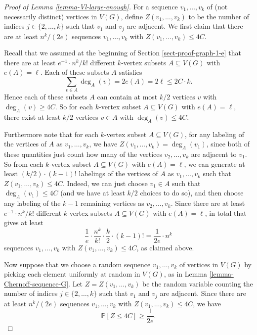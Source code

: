 \begin{proof}[Proof of Lemma \ref{lemma-Vl-large-enough}]
For a sequence $v_1,\dots, v_k$ of (not necessarily distinct) vertices in $V(G)$, define $Z(v_1,\dots,v_k)$ to be the number of indices $j\in \lbrace 2,\dots,k\rbrace$ such that $v_1$ and $v_j$ are adjacent. We first claim that there are at least $n^k/(2e)$ sequences $v_1,\dots, v_k$ with $Z(v_1,\dots,v_k)\leq 4C$.

Recall that we assumed at the beginning of Section \ref{sect-proof-graph-1-e} that there are at least $e^{-1}\cdot n^k/k!$ different $k$-vertex subsets $A\subseteq V(G)$ with $e(A)=\ell$. Each of these subsets $A$ satisfies
\[\sum_{v\in A}\deg_A(v)=2e(A)=2\ell\leq 2C\cdot k.\]
Hence each of these subsets $A$ can contain at most $k/2$ vertices $v$ with $\deg_A(v)\geq 4C$. So for each $k$-vertex subset $A\subseteq V(G)$ with $e(A)=\ell$, there exist at least $k/2$ vertices $v\in A$ with $\deg_A(v)\leq 4C$.

Furthermore note that for each $k$-vertex subset $A\subseteq V(G)$, for any labeling of the vertices of $A$ as $v_1,\dots,v_k$, we have $Z(v_1,\dots,v_k)=\deg_A(v_1)$, since both of these quantities just count how many of the vertices $v_2,\dots,v_k$ are adjacent to $v_1$. So from each $k$-vertex subset $A\subseteq V(G)$ with $e(A)=\ell$, we can generate at least $(k/2)\cdot (k-1)!$ labelings of the vertices of $A$ as $v_1,\dots,v_k$ such that $Z(v_1,\dots,v_k)\leq 4C$. Indeed, we can just choose $v_1\in A$ such that $\deg_A(v_1)\leq 4C$ (and we have at least $k/2$ choices to do so), and then choose any labeling of the $k-1$ remaining vertices as $v_2,\dots,v_k$. Since there are at least $e^{-1}\cdot n^k/k!$ different $k$-vertex subsets $A\subseteq V(G)$ with $e(A)=\ell$, in total that gives at least
\[\frac{1}{e}\cdot \frac{n^k}{k!}\cdot \frac{k}{2}\cdot (k-1)!=\frac{1}{2e}\cdot n^k\]
sequences $v_1,\dots, v_k$ with $Z(v_1,\dots,v_k)\leq 4C$, as claimed above.

Now suppose that we choose a random sequence $v_1,\dots,v_k$ of vertices in $V(G)$ by picking each element uniformly at random in $V(G)$, as in Lemma \ref{lemma-Chernoff-sequence-G}. Let $Z=Z(v_1,\dots,v_k)$ be the random variable counting the number of indices $j\in \lbrace 2,\dots,k\rbrace$ such that $v_1$ and $v_j$ are adjacent. Since there are at least $n^k/(2e)$ sequences $v_1,\dots, v_k$ with $Z(v_1,\dots,v_k)\leq 4C$, we have
\begin{equation}\label{ineq-prob-Z-4C-1}
\mathbb{P}[Z\leq 4C]\geq \frac{1}{2e}.
\end{equation}


\end{proof}
